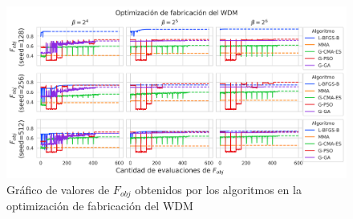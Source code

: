 \begin{landscape}
\begin{figure}[ht]
  \centering
  \includegraphics[scale=1.0]{image/results/wdm/wdm-opt-fab.png}
  \caption{Gráfico de valores de $F_{obj}$ obtenidos por los algoritmos en la optimización de fabricación del WDM}
  \label{fig:wdm-fab}
\end{figure}
\end{landscape}

